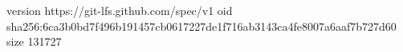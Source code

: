 version https://git-lfs.github.com/spec/v1
oid sha256:6ca3b0bd7f496b191457cb0617227de1f716ab3143ca4fe8007a6aaf7b727d60
size 131727
